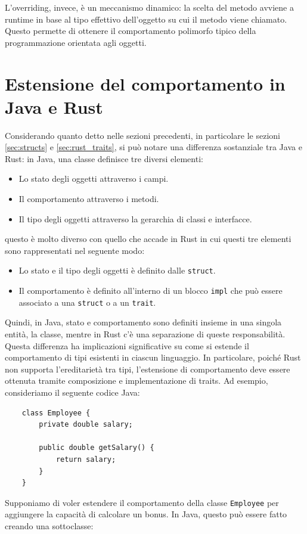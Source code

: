 L'overriding, invece, è un meccanismo dinamico: la scelta del metodo avviene a runtime in base al tipo effettivo dell'oggetto su cui il metodo viene chiamato. Questo permette di ottenere il comportamento polimorfo tipico della programmazione orientata agli oggetti. 
\section{Estensione del comportamento in Java e Rust}
\label{sec:extending_behavior}
Considerando quanto detto nelle sezioni precedenti, in particolare le sezioni \ref{sec:structs} e \ref{sec:rust_traits}, si può notare una differenza sostanziale tra Java e Rust: in Java, una classe definisce tre diversi elementi:
\begin{itemize}
    \item Lo stato degli oggetti attraverso i campi.
    \item Il comportamento attraverso i metodi.
    \item Il tipo degli oggetti attraverso la gerarchia di classi e interfacce.
\end{itemize}
questo è molto diverso con quello che accade in Rust in cui questi tre elementi sono rappresentati nel seguente modo:
\begin{itemize}
    \item Lo stato e il tipo degli oggetti è definito dalle \texttt{struct}.
    \item Il comportamento è definito all'interno di un blocco \texttt{impl} che può essere associato a una \texttt{struct} o a un \texttt{trait}.
\end{itemize}
Quindi, in Java, stato e comportamento sono definiti insieme in una singola entità, la classe, mentre in Rust c'è una separazione di queste responsabilità. Questa differenza ha implicazioni significative su come si estende il comportamento di tipi esistenti in ciascun linguaggio. In particolare, poiché Rust non supporta l'ereditarietà tra tipi, l'estensione di comportamento deve essere ottenuta tramite composizione e implementazione di traits. Ad esempio, consideriamo il seguente codice Java:
\begin{verbatim}
    class Employee {
        private double salary;
        
        public double getSalary() {
            return salary;
        }
    }
\end{verbatim}
Supponiamo di voler estendere il comportamento della classe \texttt{Employee} per aggiungere la capacità di calcolare un bonus. In Java, questo può essere fatto creando una sottoclasse:
